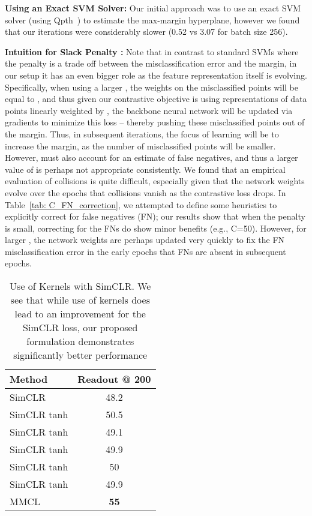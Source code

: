 \documentclass[letterpaper]{article} \usepackage{aaai22}  \usepackage{times}  \usepackage{helvet}  \usepackage{courier}  \usepackage[hyphens]{url}  \usepackage{graphicx} \urlstyle{rm} \def\UrlFont{\rm}  \usepackage{natbib}  \usepackage{caption} \DeclareCaptionStyle{ruled}{labelfont=normalfont,labelsep=colon,strut=off} \frenchspacing  \setlength{\pdfpagewidth}{8.5in}  \setlength{\pdfpageheight}{11in}
\begin{document}
\noindent\textbf{Using an Exact SVM Solver:}
Our initial approach was to use an exact SVM solver (using Qpth~\cite{amos2017optnet}) to estimate the max-margin hyperplane, however we found that our iterations were considerably slower (0.52 vs 3.07 for batch size 256).

\noindent\textbf{Intuition for Slack Penalty :}
Note that in contrast to standard SVMs where the penalty  is a trade off between the misclassification error and the margin, in our setup it has an even bigger role as the feature representation itself is evolving. Specifically, when using a larger , the  weights on the misclassified points will be equal to , and thus given our contrastive objective is using representations of data points linearly weighted by , the backbone neural network will be updated via gradients to minimize this loss -- thereby pushing these misclassified points out of the margin. Thus, in subsequent iterations, the focus of learning will be to increase the margin, as the number of misclassified points will be smaller. However,  must also account for an estimate of false negatives, and thus a larger value of  is perhaps not appropriate consistently. We found that an empirical evaluation of collisions is quite difficult, especially given that the network weights evolve over the epochs that collisions vanish as the contrastive loss drops. In Table~\ref{tab: C_FN_correction}, we attempted to define some heuristics to explicitly correct for false negatives (FN); our results show that when the penalty  is small, correcting for the FNs do show minor benefits (e.g., C=50). However, for larger , the network weights are perhaps updated very quickly to fix the FN misclassification error in the early epochs that FNs are absent in subsequent epochs. 

\begin{table}[]
    \centering
    \begin{tabular}{l|c}
    \toprule
        Method & Readout @ 200 \\
        \midrule
        SimCLR & 48.2 \\
        SimCLR tanh  & 50.5 \\
        SimCLR tanh  & 49.1 \\
        SimCLR tanh  & 49.9 \\
        SimCLR tanh  & 50 \\
        SimCLR tanh  & 49.9 \\
        MMCL & \textbf{55} \\
        \bottomrule
    \end{tabular}
    \caption{Use of Kernels with SimCLR. We see that while use of kernels does lead to an improvement for the SimCLR loss, our proposed formulation demonstrates significantly better performance }
    \label{tab: kernel_simclr}
\end{table}
\end{document}
